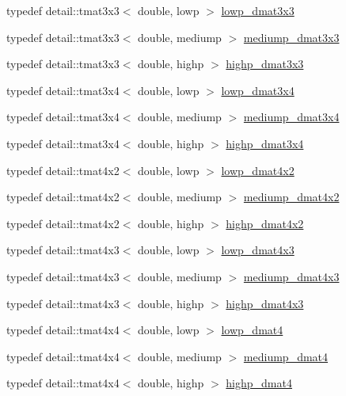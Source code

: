 \begin{CompactItemize}
\item 
typedef detail::tmat3x3$<$ double, lowp $>$ \hyperlink{group__core__precision_gea1bc4ede38e1b904f01ff5ce59210ea}{lowp\_\-dmat3x3}
\item 
typedef detail::tmat3x3$<$ double, mediump $>$ \hyperlink{group__core__precision_g2f73508d8192390ca9f9b569f544fade}{mediump\_\-dmat3x3}
\item 
typedef detail::tmat3x3$<$ double, highp $>$ \hyperlink{group__core__precision_gd7229dea82287910d88e6e8566e39fc7}{highp\_\-dmat3x3}
\item 
typedef detail::tmat3x4$<$ double, lowp $>$ \hyperlink{group__core__precision_g4640e1d20ad705842525e79a4cc57b15}{lowp\_\-dmat3x4}
\item 
typedef detail::tmat3x4$<$ double, mediump $>$ \hyperlink{group__core__precision_gedd814e706701200b13b86fc6fd7b373}{mediump\_\-dmat3x4}
\item 
typedef detail::tmat3x4$<$ double, highp $>$ \hyperlink{group__core__precision_gff199c8d04a8edb92ed43283e8694c59}{highp\_\-dmat3x4}
\item 
typedef detail::tmat4x2$<$ double, lowp $>$ \hyperlink{group__core__precision_g28a7ef670069c3707f19b9de1039517e}{lowp\_\-dmat4x2}
\item 
typedef detail::tmat4x2$<$ double, mediump $>$ \hyperlink{group__core__precision_g03056b616496470371473cd5df4dc1f8}{mediump\_\-dmat4x2}
\item 
typedef detail::tmat4x2$<$ double, highp $>$ \hyperlink{group__core__precision_ga4fb1ed350a6cd053abb9b093d13ce0d}{highp\_\-dmat4x2}
\item 
typedef detail::tmat4x3$<$ double, lowp $>$ \hyperlink{group__core__precision_gbc1be51eb0cae7cd4b1d6483a954c35d}{lowp\_\-dmat4x3}
\item 
typedef detail::tmat4x3$<$ double, mediump $>$ \hyperlink{group__core__precision_gfa1ba33d2748737129cde471fedbf9c5}{mediump\_\-dmat4x3}
\item 
typedef detail::tmat4x3$<$ double, highp $>$ \hyperlink{group__core__precision_gf8aeba0eecc5c651e0f06414b6e37754}{highp\_\-dmat4x3}
\item 
typedef detail::tmat4x4$<$ double, lowp $>$ \hyperlink{group__core__precision_gea69794db4e619881b77d37bf84b337e}{lowp\_\-dmat4}
\item 
typedef detail::tmat4x4$<$ double, mediump $>$ \hyperlink{group__core__precision_g73de517f040f7d50746bbe273a396685}{mediump\_\-dmat4}
\item 
typedef detail::tmat4x4$<$ double, highp $>$ \hyperlink{group__core__precision_g9a5d95e476d451d28d3939ac7f124baf}{highp\_\-dmat4}

\end{CompactItemize}
